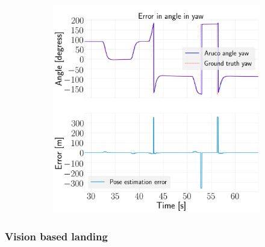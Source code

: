 \documentclass[../Head/report.tex]{subfiles}
\begin{document}
\begin{figure}[H]
\begin{subfigure}[t]{.30\textwidth}
        \caption{}
        \label{fig:vision_navigation_error_pitch}
    \end{subfigure}
     \hspace{0.2em}
    \begin{subfigure}[t]{.30\textwidth}
        \centering
        \includegraphics[width=\textwidth]{../Figures/vision_navigation/test1_full_pattern_board/error_yaw/pose_error_yaw_test1.png}
        \caption{}
        \label{fig:vision_navigation_error_yaw}
    \end{subfigure}
    \caption{}
    \label{fig:vision_navigation_error_angle}
\end{figure}

\subsubsection{Vision based landing}
\end{document}
